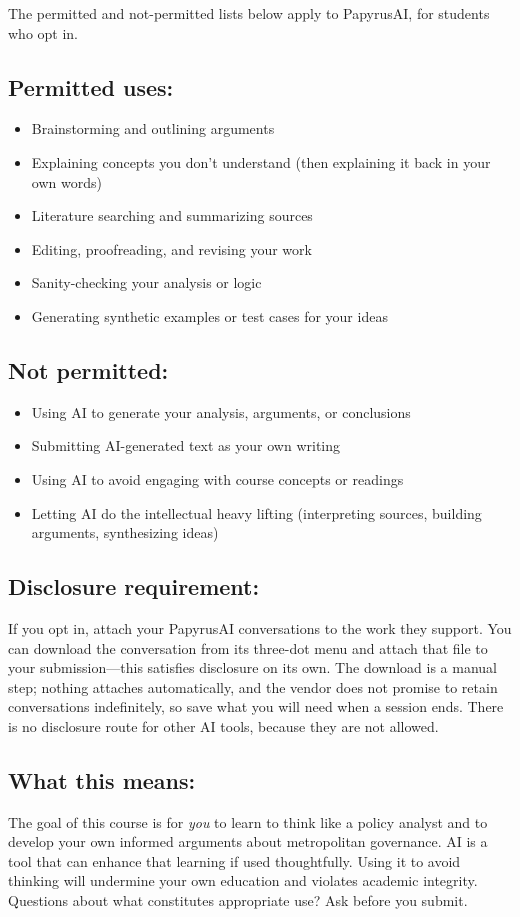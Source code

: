 \documentclass[12pt]{article}
\begin{document}
The permitted and not-permitted lists below apply to PapyrusAI, for students who opt in.

\subsection*{Permitted uses:}
\begin{itemize}
\item Brainstorming and outlining arguments
\item Explaining concepts you don't understand (then explaining it back in your own words)
\item Literature searching and summarizing sources
\item Editing, proofreading, and revising your work
\item Sanity-checking your analysis or logic
\item Generating synthetic examples or test cases for your ideas
\end{itemize}

\subsection*{Not permitted:}
\begin{itemize}
\item Using AI to generate your analysis, arguments, or conclusions
\item Submitting AI-generated text as your own writing
\item Using AI to avoid engaging with course concepts or readings
\item Letting AI do the intellectual heavy lifting (interpreting sources, building arguments, synthesizing ideas)
\end{itemize}

\subsection*{Disclosure requirement:}
If you opt in, attach your PapyrusAI conversations to the work they support. You can download the conversation from its three-dot menu and attach that file to your submission---this satisfies disclosure on its own. The download is a manual step; nothing attaches automatically, and the vendor does not promise to retain conversations indefinitely, so save what you will need when a session ends. There is no disclosure route for other AI tools, because they are not allowed.

\subsection*{What this means:}
The goal of this course is for \emph{you} to learn to think like a policy analyst and to develop your own informed arguments about metropolitan governance. AI is a tool that can enhance that learning if used thoughtfully. Using it to avoid thinking will undermine your own education and violates academic integrity. Questions about what constitutes appropriate use? Ask before you submit.
\end{document}
